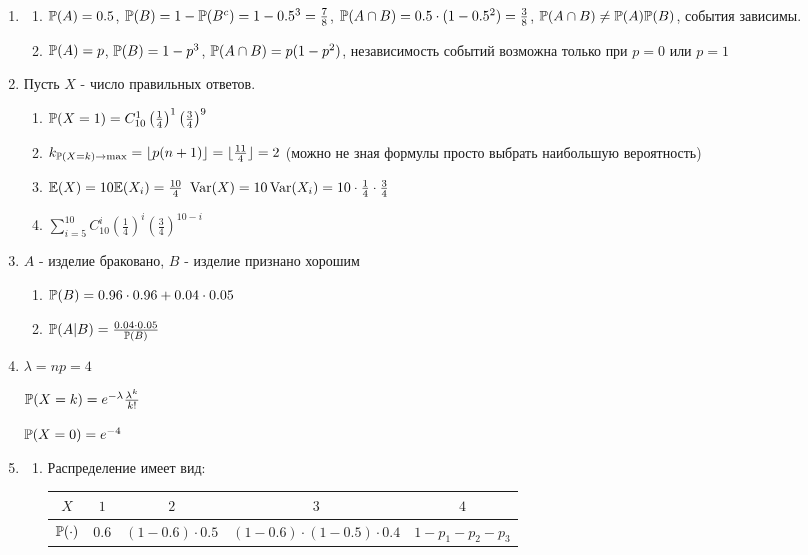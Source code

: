 \begin{enumerate}
\item
\begin{enumerate}
\item $\P(A)=0.5$, $\P(B)=1-\P(B^{c})=1-0.5^{3}=\frac{7}{8}$, $\P(A\cap
B)=0.5\cdot (1-0.5^{2})=\frac{3}{8}$, $\P(A\cap B)\neq \P(A)\P(B)$,
события зависимы.
\item $\P(A)=p$, $\P(B)=1-p^{3}$, $\P(A\cap B)=p(1-p^{2})$,
независимость событий возможна только при $p=0$ или $p=1$
\end{enumerate}
\item  Пусть $X$ - число правильных ответов.
\begin{enumerate}
\item $\P(X=1)=C_{10}^{1}\left(\frac{1}{4}\right)^{1}\left(\frac{3}{4}\right)^{9}$
\item $k_{\P(X=k)\rightarrow \max}=\lfloor p(n+1)\rfloor=\lfloor
\frac{11}{4}\rfloor=2$ (можно не зная формулы просто выбрать
наибольшую вероятность)
\item $\E(X)=10\E(X_{i})=\frac{10}{4}$
$\Var(X)=10\Var(X_{i})=10 \cdot \frac{1}{4} \cdot \frac{3}{4}$
\item $\sum_{i=5}^{10}C_{10}^{i}\left(\frac{1}{4}\right)^{i}\left(\frac{3}{4}\right)^{10-i}$
\end{enumerate}
\item $A$ - изделие браковано, $B$ - изделие признано хорошим
\begin{enumerate}
\item $\P(B)=0.96\cdot 0.96+0.04\cdot 0.05$
\item $\P(A|B)=\frac{0.04\cdot 0.05}{\P(B)}$
\end{enumerate}
\item  $\lambda=np=4$

$\P(X=k)=e^{-\lambda}\frac{\lambda^{k}}{k!}$

$\P(X=0)=e^{-4}$
\item
\begin{enumerate}
\item Распределение имеет вид:

\begin{tabular}{@{}ccccc@{}}
\toprule
$X$       & $1$   & $2$               & $3$                           & $4$             \\ \midrule
$\P(\cdot)$ & $0.6$ & $(1-0.6)\cdot0.5$ & $(1-0.6)\cdot(1-0.5)\cdot0.4$ & $1-p_1-p_2-p_3$ \\ \bottomrule
\end{tabular}


\end{enumerate}
\end{enumerate}
